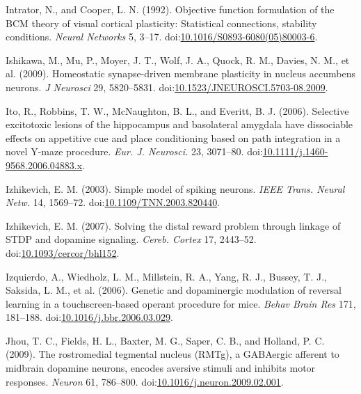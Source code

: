 \documentclass[
  11pt,
  a4paper,
]{scrbook}
\newlength{\cslhangindent}
\newenvironment{CSLReferences}[2] %
 {\begin{list}{}{%
  \setlength{\itemindent}{0pt}
  \setlength{\leftmargin}{0pt}
  \setlength{\parsep}{0pt}
  \ifodd #1
   \setlength{\leftmargin}{\cslhangindent}
   \setlength{\itemindent}{-1\cslhangindent}
  \fi
  \setlength{\itemsep}{#2\baselineskip}}}
 {\end{list}}
\begin{document}
\begin{CSLReferences}{1}{1}
Intrator, N., and Cooper, L. N. (1992). {Objective function formulation
of the BCM theory of visual cortical plasticity: Statistical
connections, stability conditions}. \emph{Neural Networks} 5, 3--17.
doi:\href{https://doi.org/10.1016/S0893-6080(05)80003-6}{10.1016/S0893-6080(05)80003-6}.

Ishikawa, M., Mu, P., Moyer, J. T., Wolf, J. A., Quock, R. M., Davies,
N. M., et al. (2009). Homeostatic synapse-driven membrane plasticity in
nucleus accumbens neurons. \emph{J Neurosci} 29, 5820--5831.
doi:\href{https://doi.org/10.1523/JNEUROSCI.5703-08.2009}{10.1523/JNEUROSCI.5703-08.2009}.

Ito, R., Robbins, T. W., McNaughton, B. L., and Everitt, B. J. (2006).
{Selective excitotoxic lesions of the hippocampus and basolateral
amygdala have dissociable effects on appetitive cue and place
conditioning based on path integration in a novel Y-maze procedure.}
\emph{Eur. J. Neurosci.} 23, 3071--80.
doi:\href{https://doi.org/10.1111/j.1460-9568.2006.04883.x}{10.1111/j.1460-9568.2006.04883.x}.

Izhikevich, E. M. (2003). {Simple model of spiking neurons.} \emph{IEEE
Trans. Neural Netw.} 14, 1569--72.
doi:\href{https://doi.org/10.1109/TNN.2003.820440}{10.1109/TNN.2003.820440}.

Izhikevich, E. M. (2007). {Solving the distal reward problem through
linkage of STDP and dopamine signaling.} \emph{Cereb. Cortex} 17,
2443--52.
doi:\href{https://doi.org/10.1093/cercor/bhl152}{10.1093/cercor/bhl152}.

Izquierdo, A., Wiedholz, L. M., Millstein, R. A., Yang, R. J., Bussey,
T. J., Saksida, L. M., et al. (2006). Genetic and dopaminergic
modulation of reversal learning in a touchscreen-based operant procedure
for mice. \emph{Behav Brain Res} 171, 181--188.
doi:\href{https://doi.org/10.1016/j.bbr.2006.03.029}{10.1016/j.bbr.2006.03.029}.

Jhou, T. C., Fields, H. L., Baxter, M. G., Saper, C. B., and Holland, P.
C. (2009). {The rostromedial tegmental nucleus (RMTg), a GABAergic
afferent to midbrain dopamine neurons, encodes aversive stimuli and
inhibits motor responses.} \emph{Neuron} 61, 786--800.
doi:\href{https://doi.org/10.1016/j.neuron.2009.02.001}{10.1016/j.neuron.2009.02.001}.


\end{CSLReferences}
\end{document}
